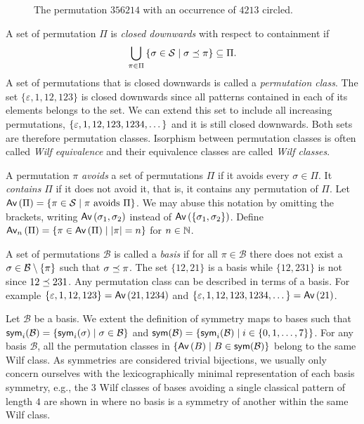\begin{figure}[ht!]
    \centering
    
    \caption{The permutation $356214$ with an occurrence of $4213$ circled.}
    \label{fig:pattern_containment}
\end{figure}

A set of permutation $\Pi$ is \emph{closed downwards} with respect to containment if 
\[
    \bigcup_{\pi \in \Pi}\cset{\sigma \in \mathcal{S}}{\contains{\pi}{\sigma}} \subseteq \Pi.
\]
A set of permutations that is closed downwards is called a \emph{permutation class}. The set $\{\varepsilon, 1, 12, 123\}$ is closed downwards since all patterns contained in each of its elements belongs to the set. We can extend this set to include all increasing permutations, $\set{\varepsilon, 1, 12, 123, 1234, \dotsc}$ and it is still closed downwards. Both sets are therefore permutation classes. Isorphism between permutation classes is often called \emph{Wilf equivalence} and their equivalence classes are called \emph{Wilf classes}. 

A permutation $\pi$ \emph{avoids} a set of permutations $\Pi$ if it avoids every $\sigma \in \Pi$. It \emph{contains} $\Pi$ if it does not avoid it, that is, it contains any permutation of $\Pi$. Let $\Av{\Pi} = \cset{\pi \in \mathcal{S}}{\pi \text{ avoids } \Pi}$. We may abuse this notation by omitting the brackets, writing $\Av{\sigma_1,\sigma_2}$ instead of $\Av{\set{\sigma_1,\sigma_2}}$. Define $\textsf{Av}_n\left(\Pi\right) = \cset{\pi \in \Av{\Pi}}{|\pi| = n}$ for $n\in\N$.

A set of permutations $\mathcal{B}$ is called a \emph{basis} if for all $\pi\in\mathcal{B}$ there does not exist a $\sigma \in \mathcal{B} \setminus \set{\pi}$ such that $\contains{\pi}{\sigma}$. The set $\{12,21\}$ is a basis while $\{12,231\}$ is not since $\contains{231}{12}$. Any permutation class can be described in terms of a basis. For example $\{\varepsilon,1,12,123\} = \Av{21, 1234}$ and $\{\varepsilon, 1, 12, 123, 1234,\dotsc\} = \Av{21}$.

Let $\mathcal{B}$ be a basis. We extent the definition of symmetry maps to bases such that $\textsf{sym}_i(\mathcal{B}) = \cset{\textsf{sym}_i(\sigma)}{\sigma \in \mathcal{B}}$ and $\textsf{sym}(\mathcal{B}) = \cset{\textsf{sym}_i(\mathcal{B})}{i \in \set{0,1,\dotsc,7}}$. For any basis $\mathcal{B}$, all the permutation classes in $\cset{\Av{B}}{B \in \textsf{sym}(\mathcal{B})}$ belong to the same Wilf class. As symmetries are considered trivial bijections, we usually only concern ourselves with the lexicographically minimal representation of each basis symmetry, e.g., the 3 Wilf classes of bases avoiding a single classical pattern of length $4$ are shown in  where no basis is a symmetry of another within the same Wilf class.

